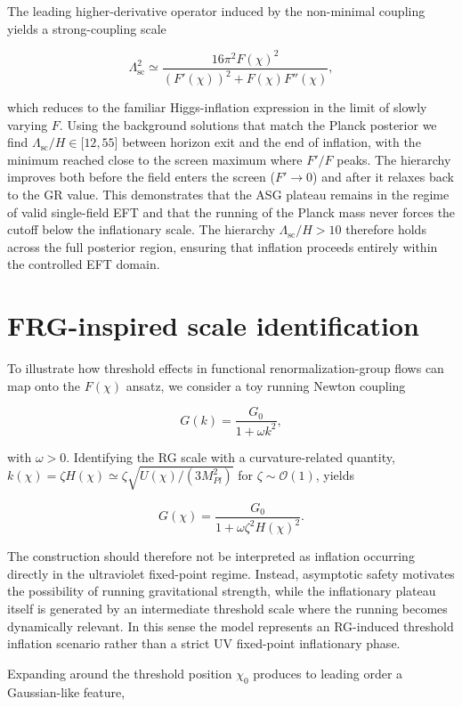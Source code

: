 \documentclass[
]{article}
\begin{document}
The leading higher-derivative operator induced by the non-minimal
coupling yields a strong-coupling scale

\[
\Lambda_{\text{sc}}^{2} \simeq \frac{16\pi^{2} F(\chi)^{2}}{\left( F'(\chi) \right)^{2} + F(\chi) F''(\chi)},
\]

which reduces to the familiar Higgs-inflation expression in the limit of
slowly varying \(F\). Using the background solutions that match the
Planck posterior we find
\(\Lambda_{\text{sc}}/H \in \lbrack 12, 55 \rbrack\) between horizon
exit and the end of inflation, with the minimum reached close to the
screen maximum where \(F'/F\) peaks. The hierarchy improves both before
the field enters the screen (\(F' \rightarrow 0\)) and after it relaxes
back to the GR value. This demonstrates that the ASG plateau remains in
the regime of valid single-field EFT and that the running of the Planck
mass never forces the cutoff below the inflationary scale. The hierarchy
\(\Lambda_{\text{sc}}/H > 10\) therefore holds across the full posterior
region, ensuring that inflation proceeds entirely within the controlled
EFT domain.

\section{FRG-inspired scale
identification}\label{frg-inspired-scale-identification}

To illustrate how threshold effects in functional renormalization-group
flows can map onto the \(F(\chi)\) ansatz, we consider a toy running
Newton coupling

\[
G(k) = \frac{G_{0}}{1 + \omega k^{2}},
\]

with \(\omega > 0\). Identifying the RG scale with a curvature-related
quantity,
\(k(\chi) = \zeta H(\chi) \simeq \zeta\sqrt{U(\chi)/(3M_{Pl}^{2})}\) for
\(\zeta \sim \mathcal{O}(1)\), yields

\[
G(\chi) = \frac{G_{0}}{1 + \omega\zeta^{2}H(\chi)^{2}}.
\]

The construction should therefore not be interpreted as inflation
occurring directly in the ultraviolet fixed-point regime. Instead,
asymptotic safety motivates the possibility of running gravitational
strength, while the inflationary plateau itself is generated by an
intermediate threshold scale where the running becomes dynamically
relevant. In this sense the model represents an RG-induced threshold
inflation scenario rather than a strict UV fixed-point inflationary
phase.

Expanding around the threshold position \(\chi_{0}\) produces to leading
order a Gaussian-like feature,
\end{document}
